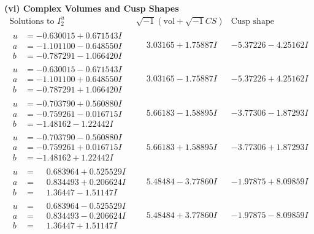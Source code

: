 \documentclass[1p]{elsarticle_modified}
\theoremstyle{definition}
\newcommand{\I}{\sqrt{-1}}
\begin{document}
\newpage\flushleft \textbf{(vi) Complex Volumes and Cusp Shapes}
$$\begin{array}{c|c|c}  
\text{Solutions to }I^u_{2}& \I (\text{vol} + \sqrt{-1}CS) & \text{Cusp shape}\\
 \hline 
\begin{aligned}
u &= -0.630015 + 0.671543 I \\
a &= -1.101100 - 0.648550 I \\
b &= -0.787291 - 1.066420 I\end{aligned}
 & \phantom{-}3.03165 + 1.75887 I & -5.37226 - 4.25162 I \\ \hline\begin{aligned}
u &= -0.630015 - 0.671543 I \\
a &= -1.101100 + 0.648550 I \\
b &= -0.787291 + 1.066420 I\end{aligned}
 & \phantom{-}3.03165 - 1.75887 I & -5.37226 + 4.25162 I \\ \hline\begin{aligned}
u &= -0.703790 + 0.560880 I \\
a &= -0.759261 - 0.016715 I \\
b &= -1.48162 - 1.22442 I\end{aligned}
 & \phantom{-}5.66183 - 1.58895 I & -3.77306 - 1.87293 I \\ \hline\begin{aligned}
u &= -0.703790 - 0.560880 I \\
a &= -0.759261 + 0.016715 I \\
b &= -1.48162 + 1.22442 I\end{aligned}
 & \phantom{-}5.66183 + 1.58895 I & -3.77306 + 1.87293 I \\ \hline\begin{aligned}
u &= \phantom{-}0.683964 + 0.525529 I \\
a &= \phantom{-}0.834493 + 0.206624 I \\
b &= \phantom{-}1.36447 - 1.51147 I\end{aligned}
 & \phantom{-}5.48484 - 3.77860 I & -1.97875 + 8.09859 I \\ \hline\begin{aligned}
u &= \phantom{-}0.683964 - 0.525529 I \\
a &= \phantom{-}0.834493 - 0.206624 I \\
b &= \phantom{-}1.36447 + 1.51147 I\end{aligned}
 & \phantom{-}5.48484 + 3.77860 I & -1.97875 - 8.09859 I \\ \hline\begin{aligned}

\end{aligned}
\end{array}$$
\end{document}
